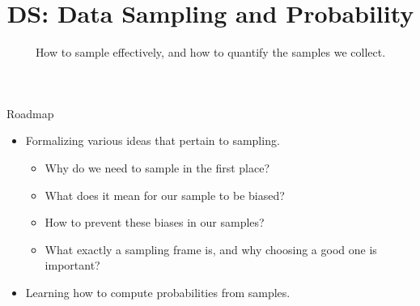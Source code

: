 \documentclass[aspectratio=169]{../latex_main/tntbeamer}  %
\title[Introduction]{DS: Data Sampling and Probability}
\subtitle{How to sample effectively, and how to quantify the samples we collect.}
\begin{document}
	
	\maketitle
	
	\begin{frame}{Roadmap}
	    \begin{itemize}
	        \item Formalizing various ideas that pertain to sampling.
	        \begin{itemize}
	            \item Why do we need to sample in the first place?
	            \item What does it mean for our sample to be biased?
	            \item How to prevent these biases in our samples?
	            \item What exactly a sampling frame is, and why choosing a good one is important?
	        \end{itemize}
	        \item Learning how to compute probabilities from samples.
		    \end{itemize}
	\end{frame}
	
\end{document}
